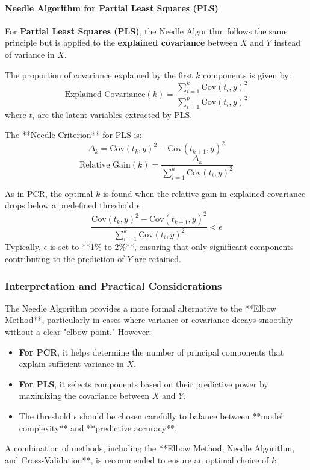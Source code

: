 \documentclass[11pt,twoside,a4paper]{article}
\begin{document}
\paragraph{Needle Algorithm for Partial Least Squares (PLS)}
For \textbf{Partial Least Squares (PLS)}, the Needle Algorithm follows the same principle but is applied to the \textbf{explained covariance} between \( X \) and \( Y \) instead of variance in \( X \). 

The proportion of covariance explained by the first \( k \) components is given by:
\[
\text{Explained Covariance}(k) = \frac{\sum_{i=1}^{k} \text{Cov}(t_i, y)^2}{\sum_{i=1}^{p} \text{Cov}(t_i, y)^2}
\]
where \( t_i \) are the latent variables extracted by PLS.

The **Needle Criterion** for PLS is:
\[
\Delta_k = \text{Cov}(t_k, y)^2 - \text{Cov}(t_{k+1}, y)^2
\]
\[
\text{Relative Gain}(k) = \frac{\Delta_k}{\sum_{i=1}^{k} \text{Cov}(t_i, y)^2}
\]

As in PCR, the optimal \( k \) is found when the relative gain in explained covariance drops below a predefined threshold \( \epsilon \):
\[
\frac{\text{Cov}(t_k, y)^2 - \text{Cov}(t_{k+1}, y)^2}{\sum_{i=1}^{k} \text{Cov}(t_i, y)^2} < \epsilon
\]
Typically, \( \epsilon \) is set to **1\% to 2\%**, ensuring that only significant components contributing to the prediction of \( Y \) are retained.

\subsubsection{Interpretation and Practical Considerations}
The Needle Algorithm provides a more formal alternative to the **Elbow Method**, particularly in cases where variance or covariance decays smoothly without a clear "elbow point." However:
\begin{itemize}
    \item \textbf{For PCR}, it helps determine the number of principal components that explain sufficient variance in \( X \).
    \item \textbf{For PLS}, it selects components based on their predictive power by maximizing the covariance between \( X \) and \( Y \).
    \item The threshold \( \epsilon \) should be chosen carefully to balance between **model complexity** and **predictive accuracy**.
\end{itemize}
A combination of methods, including the **Elbow Method, Needle Algorithm, and Cross-Validation**, is recommended to ensure an optimal choice of \( k \).
\end{document}
